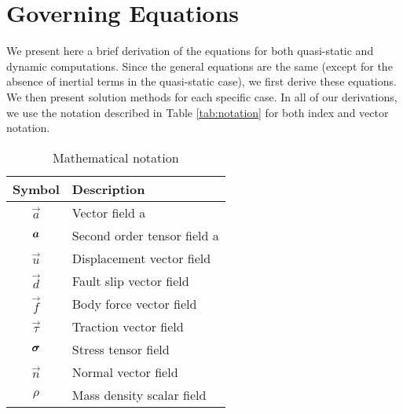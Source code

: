 \chapter{Governing Equations}
\label{cha:governing:equations}

We present here a brief derivation of the equations for both quasi-static
and dynamic computations. Since the general equations are the same
(except for the absence of inertial terms in the quasi-static case),
we first derive these equations. We then present solution methods
for each specific case. In all of our derivations, we use the notation
described in Table \vref{tab:notation} for both index
and vector notation.

\begin{table}[htbp]
  \caption{Mathematical notation}
  \label{tab:notation}
  \begin{tabular}{cp{3in}}
    \toprule
    {\bf Symbol} & {\bf Description} \\
    \midrule
    $\vec{a}$ & Vector field a \\
    $\bm{a}$ & Second order tensor field a \\
    $\vec{u}$ & Displacement vector field \\
    $\vec{{d}}$ & Fault slip vector field \\
    $\vec{f}$ & Body force vector field \\
    $\vec{\tau}$ & Traction vector field \\
    $\bm{\sigma}$ & Stress tensor field \\
    $\vec{n}$ & Normal vector field \\
    $\rho$ & Mass density scalar field \\
    \bottomrule
  \end{tabular}
\end{table}







%